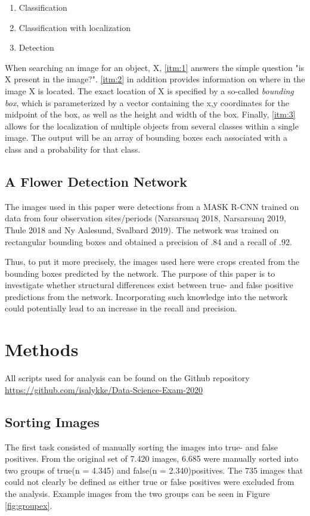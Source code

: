 \documentclass[12pt]{article}
\begin{document}
\begin{enumerate}
	\item Classification\label{itm:1}
	\item Classification with localization\label{itm:2}
	\item Detection\label{itm:3}
\end{enumerate}

When searching an image for an object, X, \ref{itm:1} answers the simple question "is X present in the image?". \ref{itm:2} in addition provides information on where in the image X is located. The exact location of X is specified by a so-called \textit{bounding box}, which is parameterized by a vector containing the x,y coordinates for the midpoint of the box, as well as the height and width of the box. Finally, \ref{itm:3} allows for the localization of multiple objects from several classes within a single image. The output will be an array of bounding boxes each associated with a class and a probability for that class.

\subsection{A Flower Detection Network}
The images used in this paper were detections from a MASK R-CNN trained on data from four observation sites/periods (Narsarsuaq 2018, Narsarsuaq 2019, Thule 2018 and Ny Aalesund, Svalbard 2019). The network was trained on rectangular bounding boxes and obtained a precision of .84 and a recall of .92. 

Thus, to put it more precisely, the images used here were crops created from the bounding boxes predicted by the network. The purpose of this paper is to investigate whether structural differences exist between true- and false positive predictions from the network. Incorporating such knowledge into the network could potentially lead to an increase in the recall and precision.


\section{Methods}
All scripts used for analysis can be found on the Github repository \url{https://github.com/isalykke/Data-Science-Exam-2020}

\subsection{Sorting Images}
The first task consisted of manually sorting the images into true- and false positives. 
From the original set of 7.420 images, 6.685 were manually sorted into two groups of true(n = 4.345) and false(n = 2.340)positives. The 735 images that could not clearly be defined as either true or false positives were excluded from the analysis. Example images from the two groups can be seen in Figure \ref{fig:groupex}.
\end{document}
